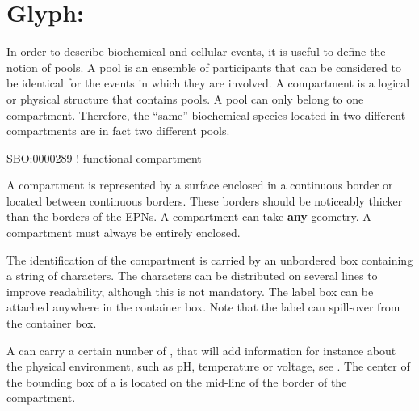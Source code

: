 

\section{Glyph: }\label{sec:compartment}

In order to describe biochemical and cellular events, it is useful to define the notion of pools. A pool is an ensemble of participants that  can be considered to be identical for the events in which they are involved. A compartment is a logical or physical structure that contains pools. A pool can only belong to one compartment. Therefore, the ``same'' biochemical species located in two different compartments are in fact two different pools. 

\begin{glyphDescription}

\glyphSboTerm  SBO:0000289 ! functional compartment 

\glyphContainer A compartment is represented by a surface enclosed in a continuous border or located between continuous borders. These borders should be noticeably thicker than the borders of the EPNs. A compartment can take \textbf{any} geometry. A compartment must always be entirely enclosed.

\glyphLabel The identification of the compartment is carried by an unbordered box containing a string of characters. The characters can be distributed on several lines to improve readability, although this is not mandatory. The label box can be attached anywhere in the container box. Note that the label can spill-over from the container box.

\glyphAux A  can carry a certain number of , that will add information for instance about the physical environment, such as pH, temperature or voltage, see .  The center of the bounding box of a  is located on the mid-line of the border of the compartment.

\end{glyphDescription}

